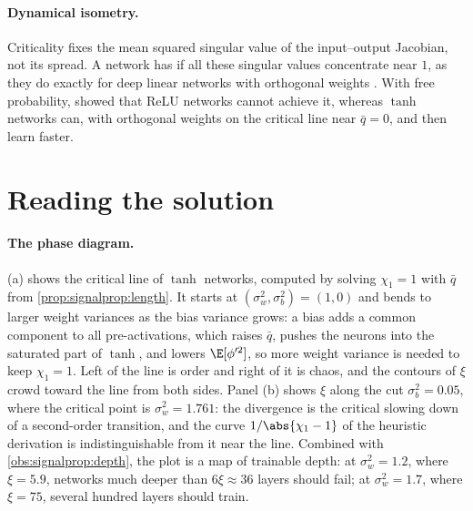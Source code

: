 \begin{refsection}
\paragraph{Dynamical isometry.} Criticality fixes the mean squared singular value of the input--output Jacobian, not its spread. A network has  if all these singular values concentrate near $1$, as they do exactly for deep linear networks with orthogonal weights \parencite{SaxeEtAl2014}. With free probability, \textcite{PenningtonEtAl2017} showed that ReLU networks cannot achieve it, whereas $\tanh$ networks can, with orthogonal weights on the critical line near $\bar q=0$, and then learn faster.

\section{Reading the solution}\label{sec:signalprop:reading}

\paragraph{The phase diagram.} (a) shows the critical line of $\tanh$ networks, computed by solving $\chi_1=1$ with $\bar q$ from \cref{prop:signalprop:length}. It starts at $(\sigma_w^2,\sigma_b^2)=(1,0)$ and bends to larger weight variances as the bias variance grows: a bias adds a common component to all pre-activations, which raises $\bar q$, pushes the neurons into the saturated part of $\tanh$, and lowers $\E[\phi'^2]$, so more weight variance is needed to keep $\chi_1=1$. Left of the line is order and right of it is chaos, and the contours of $\xi$ crowd toward the line from both sides. Panel (b) shows $\xi$ along the cut $\sigma_b^2=0.05$, where the critical point is $\sigma_w^2=1.761$: the divergence is the critical slowing down of a second-order transition, and the curve $1/\abs{\chi_1-1}$ of the heuristic derivation is indistinguishable from it near the line. Combined with \cref{obs:signalprop:depth}, the plot is a map of trainable depth: at $\sigma_w^2=1.2$, where $\xi=5.9$, networks much deeper than $6\xi\approx36$ layers should fail; at $\sigma_w^2=1.7$, where $\xi=75$, several hundred layers should train.


\end{refsection}
